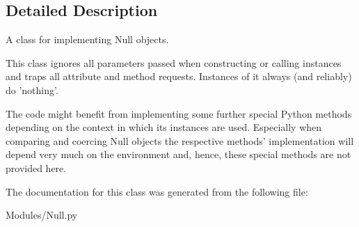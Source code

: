 \subsection{Detailed Description}
\begin{DoxyVerb}A class for implementing Null objects.

This class ignores all parameters passed when constructing or 
calling instances and traps all attribute and method requests. 
Instances of it always (and reliably) do 'nothing'.

The code might benefit from implementing some further special 
Python methods depending on the context in which its instances 
are used. Especially when comparing and coercing Null objects
the respective methods' implementation will depend very much
on the environment and, hence, these special methods are not
provided here.
\end{DoxyVerb}
 

The documentation for this class was generated from the following file\-:\begin{DoxyCompactItemize}
\item 
Modules/Null.\-py\end{DoxyCompactItemize}
